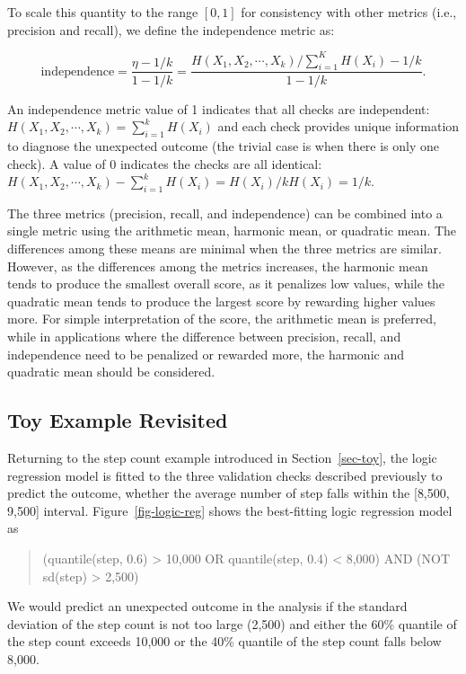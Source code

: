 \documentclass[
  12pt,
]{interact}
\begin{document}
To scale this quantity to the range \([0,1]\) for consistency with other
metrics (i.e., precision and recall), we define the independence metric
as:

\[\text{independence} = \frac{\eta - 1/k}{1 - 1/k}= \frac{H(X_1, X_2, \cdots, X_k)/\sum_{i= 1}^K H(X_i) - 1/k}{1 - 1/k}.\]

An independence metric value of 1 indicates that all checks are
independent: \(H(X_1, X_2, \cdots, X_k)=\sum_{i= 1}^k H(X_i)\) and each
check provides unique information to diagnose the unexpected outcome
(the trivial case is when there is only one check). A value of 0
indicates the checks are all identical:
\(H(X_1, X_2, \cdots, X_k)- \sum_{i= 1}^k H(X_i) = H(X_i)/ k H(X_i) = 1/k\).

The three metrics (precision, recall, and independence) can be combined
into a single metric using the arithmetic mean, harmonic mean, or
quadratic mean. The differences among these means are minimal when the
three metrics are similar. However, as the differences among the metrics
increases, the harmonic mean tends to produce the smallest overall
score, as it penalizes low values, while the quadratic mean tends to
produce the largest score by rewarding higher values more. For simple
interpretation of the score, the arithmetic mean is preferred, while in
applications where the difference between precision, recall, and
independence need to be penalized or rewarded more, the harmonic and
quadratic mean should be considered.

\subsection{Toy Example Revisited}\label{toy-example-revisited}

Returning to the step count example introduced in Section~\ref{sec-toy},
the logic regression model is fitted to the three validation checks
described previously to predict the outcome, whether the average number
of step falls within the {[}8,500, 9,500{]} interval.
Figure~\ref{fig-logic-reg} shows the best-fitting logic regression model
as

\begin{quote}
(quantile(step, 0.6) \textgreater{} 10,000 OR quantile(step, 0.4)
\textless{} 8,000) AND (NOT sd(step) \textgreater{} 2,500)
\end{quote}

We would predict an unexpected outcome in the analysis if the standard
deviation of the step count is not too large (2,500) and either the 60\%
quantile of the step count exceeds 10,000 or the 40\% quantile of the
step count falls below 8,000.
\end{document}

